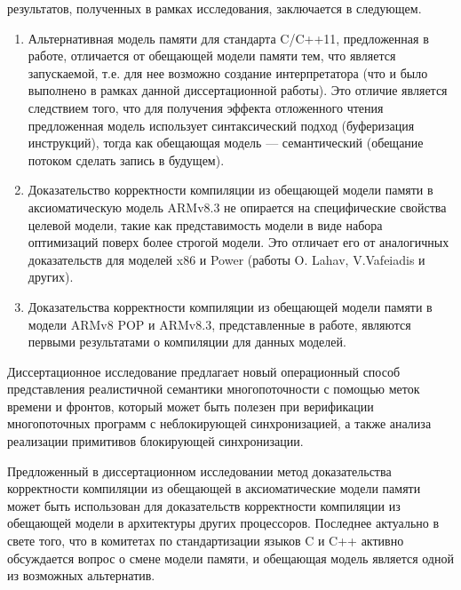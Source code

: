 {\novelty} результатов, полученных в рамках исследования, заключается в следующем.
\begin{enumerate}
  \item Альтернативная модель памяти для стандарта C/C++11, предложенная в работе, отличается от обещающей модели
  памяти тем, что является запускаемой,
  т.е. для нее возможно создание интерпретатора (что и было выполнено в рамках данной диссертационной работы).
  Это отличие является следствием того, что для получения эффекта отложенного чтения предложенная модель использует
  синтаксический подход (буферизация инструкций), тогда как обещающая модель --- семантический (обещание потоком сделать
  запись в будущем).
  \item Доказательство корректности компиляции из обещающей модели памяти в аксиоматическую модель
        ARMv8.3
        не опирается на специфические свойства целевой модели, такие как представимость модели в виде
        набора оптимизаций поверх более строгой модели.
        Это отличает его от аналогичных доказательств для моделей x86 и Power
        (работы O. Lahav, V.Vafeiadis и других).
  \item Доказательства корректности компиляции из обещающей модели памяти в
  модели ARMv8 POP и ARMv8.3, представленные
  в работе, являются первыми результатами о компиляции для данных моделей.
\end{enumerate}

{\influence}
Диссертационное исследование предлагает новый
операционный способ представления реалистичной семантики многопоточности с помощью меток времени и фронтов, который
может быть полезен при верификации многопоточных программ с неблокирующей синхронизацией, а также анализа
реализации примитивов блокирующей синхронизации.

Предложенный в диссертационном исследовании метод доказательства корректности компиляции из обещающей в
аксиоматические модели памяти может быть использован для доказательств корректности компиляции
из обещающей модели в архитектуры других процессоров.
Последнее актуально в свете того, что
в комитетах по стандартизации языков C и C++ активно обсуждается вопрос о смене модели памяти, и обещающая модель 
является одной из возможных альтернатив. 

